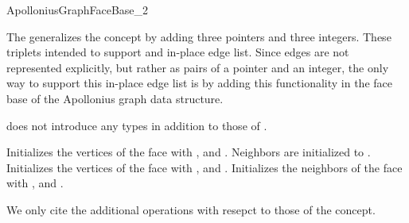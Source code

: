 
\begin{ccRefConcept}{ApolloniusGraphFaceBase_2}

\ccDefinition
The  generalizes the
 concept by adding three 
pointers and three integers. These triplets intended to support and
in-place edge list. Since edges are not represented explicitly, but
rather as pairs of a  pointer and an integer, the only way
to support this in-place edge list is by adding this functionality in
the face base of the Apollonius graph data structure.

\ccGeneralizes
{}

\ccTypes
{} does not introduce any
types in addition to those of .

\ccCreation
{}
%
{}
{Initializes the vertices of the face with ,  and
. Neighbors are initialized to .}
{}
{Initializes the vertices of the face with ,  and
. Initializes the neighbors of the face with ,
 and .}


We only cite the additional operations with resepct to those of the
 concept.


\end{ccRefConcept}
